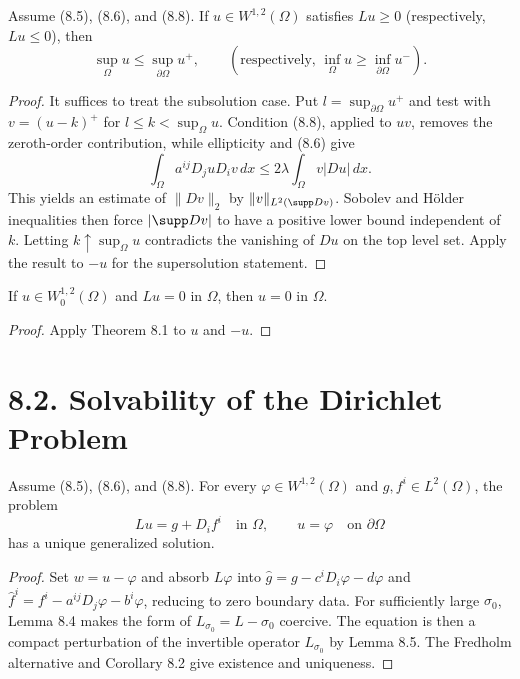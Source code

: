 \begin{theorem}
\label{gt-thm-8-1-weak-maximum-principle}
Assume (8.5), (8.6), and (8.8). If $u\in W^{1,2}(\Omega)$ satisfies
$Lu\geq0$ (respectively, $Lu\leq0$), then
\begin{equation}
\sup_\Omega u\leq\sup_{\partial\Omega}u^+,
\qquad
\left(\text{respectively, }\inf_\Omega u\geq\inf_{\partial\Omega}u^-\right).
\tag{8.9}
\end{equation}
\end{theorem}
\begin{proof}
\sketch It suffices to treat the subsolution case. Put
$l=\sup_{\partial\Omega}u^+$ and test with $v=(u-k)^+$ for
$l\leq k<\sup_\Omega u$. Condition (8.8), applied to $uv$, removes the
zeroth-order contribution, while ellipticity and (8.6) give
\begin{equation}
\tag{8.10}
\int_\Omega a^{ij}D_j uD_i v\,dx
\leq2\lambda\int_\Omega v|Du|\,dx.
\end{equation}
This yields an estimate of
$\|Dv\|_2$ by $\|v\|_{L^2(\supp Dv)}$. Sobolev and H\"older inequalities then
force $|\supp Dv|$ to have a positive lower bound independent of $k$. Letting
$k\uparrow\sup_\Omega u$ contradicts the vanishing of $Du$ on the top level set.
Apply the result to $-u$ for the supersolution statement.
\end{proof}

\begin{corollary}[Uniqueness in $W_0^{1,2}$]
\label{gt-cor-8-2-uniqueness-zero}
If $u\in W_0^{1,2}(\Omega)$ and $Lu=0$ in $\Omega$, then $u=0$ in $\Omega$.
\end{corollary}
\begin{proof}
\sketch Apply Theorem 8.1 to $u$ and $-u$.
\end{proof}

\section*{8.2. Solvability of the Dirichlet Problem}

\begin{theorem}
\label{gt-thm-8-3-solvability-generalized-dirichlet}
Assume (8.5), (8.6), and (8.8). For every $\varphi\in W^{1,2}(\Omega)$ and
$g,f^i\in L^2(\Omega)$, the problem
\[
Lu=g+D_if^i\quad\text{in }\Omega,
\qquad u=\varphi\quad\text{on }\partial\Omega
\]
has a unique generalized solution.
\end{theorem}
\begin{proof}
\sketch Set $w=u-\varphi$ and absorb $L\varphi$ into
$\hat g=g-c^iD_i\varphi-d\varphi$ and
$\hat f^i=f^i-a^{ij}D_j\varphi-b^i\varphi$, reducing to zero boundary data.
For sufficiently large $\sigma_0$, Lemma 8.4 makes the form of
$L_{\sigma_0}=L-\sigma_0$ coercive. The equation is then a compact perturbation
of the invertible operator $L_{\sigma_0}$ by Lemma 8.5. The Fredholm alternative
and Corollary 8.2 give existence and uniqueness.
\end{proof}

